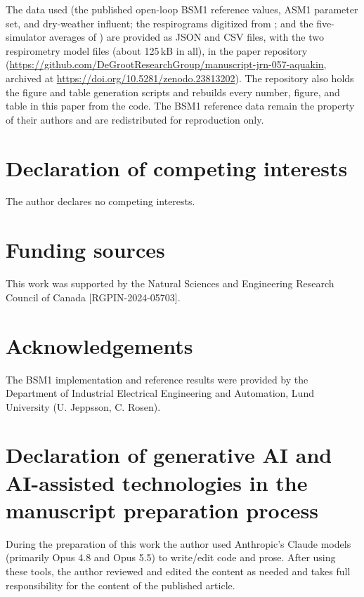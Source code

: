 \documentclass{article}
\begin{document}
The data used (the published open-loop BSM1 reference values, ASM1 parameter set, and dry-weather influent; the respirograms digitized from \citet{gupta2018thesis}; and the five-simulator averages of \citet{copp2002}) are provided as JSON and CSV files, with the two respirometry model files (about 125\,kB in all), in the paper repository (\url{https://github.com/DeGrootResearchGroup/manuscript-jrn-057-aquakin}, archived at \url{https://doi.org/10.5281/zenodo.23813202}). The repository also holds the figure and table generation scripts and rebuilds every number, figure, and table in this paper from the code. The BSM1 reference data remain the property of their authors and are redistributed for reproduction only.

\section*{Declaration of competing interests}
The author declares no competing interests.

\section*{Funding sources}
This work was supported by the Natural Sciences and Engineering Research Council of Canada [RGPIN-2024-05703].

\section*{Acknowledgements}
The BSM1 implementation and reference results were provided by the Department of Industrial Electrical Engineering and Automation, Lund University (U. Jeppsson, C. Rosen).

\section*{Declaration of generative AI and AI-assisted technologies in the manuscript preparation process}
During the preparation of this work the author used Anthropic's Claude models (primarily Opus 4.8 and Opus 5.5) to write/edit code and prose. After using these tools, the author reviewed and edited the content as needed and takes full responsibility for the content of the published article.




\newpage
\appendix
\end{document}
